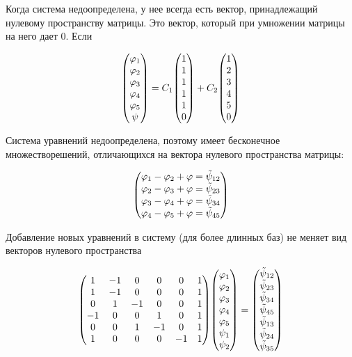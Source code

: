 Когда система недоопределена, у нее всегда есть вектор, принадлежащий нулевому пространству матрицы. Это вектор, который при умножении матрицы на него дает 0. Если

\begin{equation}
	\mqty(
	\phi_{1}\\	\phi_{2}\\	\phi_{3}\\	\phi_{4}\\	\phi_{5}\\	\psi
	)=
	C_1	\mqty(
	1\\	1\\	1\\	1\\	1\\	0\\
	)+
	C_2	\mqty(
	1\\	2\\	3\\	4\\	5\\	0\\
	)
\end{equation}

Система уравнений недоопределена, поэтому имеет бесконечное множестворешений, отличающихся на вектора нулевого пространства матрицы:

\begin{equation}
	\mqty(
	\phi_{1} - \phi_{2} + \phi = \tilde{\psi}_{12}\\
	\phi_{2} - \phi_{3} + \phi = \tilde{\psi}_{23}\\
	\phi_{3} - \phi_{4} + \phi = \tilde{\psi}_{34}\\
	\phi_{4} - \phi_{5} + \phi = \tilde{\psi}_{45}
	)
\end{equation}

Добавление новых уравнений в систему (для более длинных баз) не меняет вид векторов нулевого пространства

\begin{equation}
	\mqty(
	1&-1&0&0&0&1\\	1&-1&0&0&0&1\\	0&1&-1&0&0&1\\	-1&0&0&1&0&1\\ 0&0&1&-1&0&1\\ 1&0&0&0&-1&1
	)
	\mqty(
	\phi_{1}\\	\phi_{2}\\	\phi_{3}\\	\phi_{4}\\	\phi_{5}\\	\psi_1\\ \psi_2
	)=
	\mqty(
	\tilde{\psi}_{12}\\	\tilde{\psi}_{23}\\	\tilde{\psi}_{34}\\	\tilde{\psi}_{45}\\ \tilde{\psi}_{13}\\ \tilde{\psi}_{24}\\ \tilde{\psi}_{35}
	)
\end{equation}

